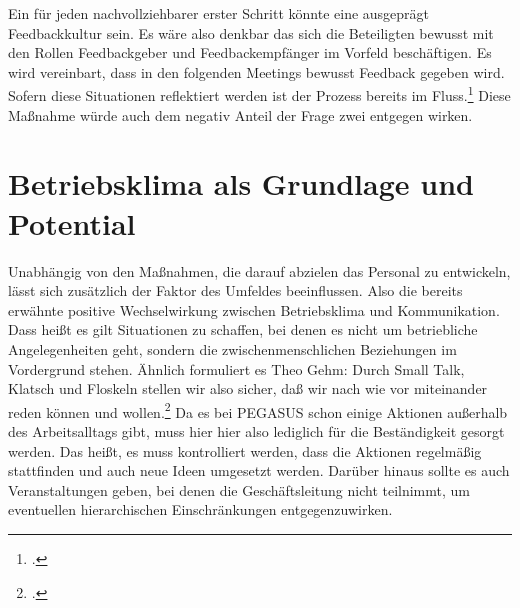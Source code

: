 \documentclass[12pt, DIV9, BCOR9mm, onecolumn, headsepline, ngerman]{scrreprt}
\begin{document}
Ein für jeden nachvollziehbarer erster Schritt könnte eine ausgeprägt Feedbackkultur sein. Es wäre also denkbar das sich die Beteiligten bewusst mit den Rollen Feedbackgeber und Feedbackempfänger im Vorfeld beschäftigen. Es wird vereinbart, dass in den folgenden Meetings bewusst Feedback gegeben wird. Sofern diese Situationen reflektiert werden ist der Prozess bereits im Fluss.\footcite[vgl.][S.128ff]{HofbauerDasMitarbeiterg} Diese Maßnahme würde auch dem negativ Anteil der Frage zwei entgegen wirken.






\section{Betriebsklima als Grundlage und Potential}


Unabhängig von den Maßnahmen, die darauf abzielen das Personal zu entwickeln, lässt sich zusätzlich der Faktor des Umfeldes beeinflussen. Also die bereits erwähnte positive Wechselwirkung zwischen Betriebsklima und Kommunikation. Dass heißt es gilt Situationen zu schaffen, bei denen es nicht um betriebliche Angelegenheiten geht, sondern die zwischenmenschlichen Beziehungen im Vordergrund stehen. Ähnlich formuliert es Theo Gehm: \glqq Durch \frqq{}Small Talk\flqq{}, Klatsch und Floskeln stellen wir also sicher, daß wir nach wie vor miteinander reden können und wollen.\grqq\footcite[S.71]{GehmKommunikation} Da es bei PEGASUS schon einige Aktionen außerhalb des Arbeitsalltags gibt, muss hier hier also lediglich für die Beständigkeit gesorgt werden. Das heißt, es muss kontrolliert werden, dass die Aktionen regelmäßig stattfinden und auch neue Ideen umgesetzt werden. Darüber hinaus sollte es auch Veranstaltungen geben, bei denen die Geschäftsleitung nicht teilnimmt, um eventuellen hierarchischen Einschränkungen entgegenzuwirken.
\end{document}

